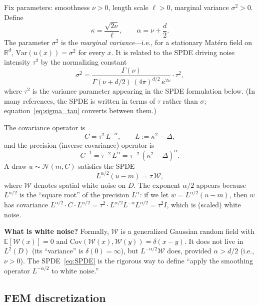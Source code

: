 \documentclass[11pt]{article}
\newcommand{\R}{\mathbb{R}}
\begin{document}
Fix parameters: smoothness $\nu > 0$, length scale $\ell > 0$, marginal variance $\sigma^2 > 0$.  Define
\[
  \kappa = \frac{\sqrt{2\nu}}{\ell}, \qquad \alpha = \nu + \frac{d}{2}.
\]
The parameter $\sigma^2$ is the \emph{marginal variance}---i.e., for a stationary Mat\'ern field on $\R^d$, $\text{Var}(u(x)) = \sigma^2$ for every $x$.  It is related to the SPDE driving noise intensity $\tau^2$ by the normalizing constant
\begin{equation}\label{eq:sigma_tau}
  \sigma^2 = \frac{\Gamma(\nu)}{\Gamma(\nu + d/2)\, (4\pi)^{d/2}\, \kappa^{2\nu}} \cdot \tau^2,
\end{equation}
where $\tau^2$ is the variance parameter appearing in the SPDE formulation below.  (In many references, the SPDE is written in terms of $\tau$ rather than $\sigma$; equation~\eqref{eq:sigma_tau} converts between them.)

The covariance operator is
\[
  C = \tau^2\, L^{-\alpha}, \qquad L := \kappa^2 - \Delta,
\]
and the precision (inverse covariance) operator is
\[
  C^{-1} = \tau^{-2}\, L^{\alpha} = \tau^{-2}\, (\kappa^2 - \Delta)^{\alpha}.
\]
A draw $u \sim \mathcal{N}(m, C)$ satisfies the SPDE
\begin{equation}\label{eq:SPDE}
  L^{\alpha/2}(u - m) = \tau\, \mathcal{W},
\end{equation}
where $\mathcal{W}$ denotes spatial white noise on $D$.  The exponent $\alpha/2$ appears because $L^{\alpha/2}$ is the ``square root'' of the precision $L^\alpha$: if we let $w = L^{\alpha/2}(u - m)$, then $w$ has covariance $L^{\alpha/2} \cdot C \cdot L^{\alpha/2} = \tau^2 \cdot L^{\alpha/2} L^{-\alpha} L^{\alpha/2} = \tau^2 I$, which is (scaled) white noise.

\medskip\noindent\textbf{What is white noise?}  Formally, $\mathcal{W}$ is a generalized Gaussian random field with $\mathbb{E}[\mathcal{W}(x)] = 0$ and $\text{Cov}(\mathcal{W}(x), \mathcal{W}(y)) = \delta(x - y)$.  It does not live in $L^2(D)$ (its ``variance'' is $\delta(0) = \infty$), but $L^{-\alpha/2}\mathcal{W}$ does, provided $\alpha > d/2$ (i.e., $\nu > 0$).  The SPDE~\eqref{eq:SPDE} is the rigorous way to define ``apply the smoothing operator $L^{-\alpha/2}$ to white noise.''

\subsection{FEM discretization}\label{sec:SPDE_FEM}
\end{document}
